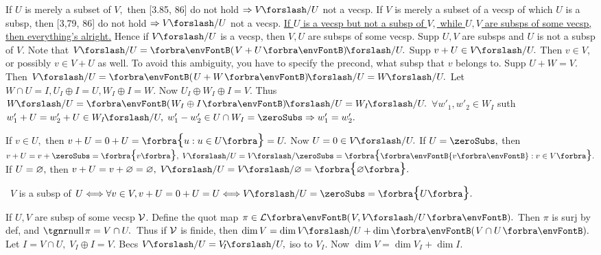 \BulletPointX\NoteFor{[3.79, 3.83]}\TextB{}
If $U$ is merely a subset of $V,$ then [3.85, 86] do not hold $\Rightarrow V\XSlash U$ not a vecsp.\TextB{}
If $V$ is merely a subset of a vecsp of which $U$ is a subsp, then [3,79, 86] do not hold $\Rightarrow V\XSlash U$ not a vecsp.\TextB{}
\uline{If $U$ is a vecsp but not a subsp of $V,$ while $U,V$ are subsps of some vecsp, then everything's alright.}\TextB{}
Hence if $V\XSlash U$ is a vecsp, then $V,U$ are subsps of some vecsp.\TextB{}
\AComm Supp $U,V$ are subsps and $U$ is not a subsp of $V.$ Note that $V\XSlash U=\Par{V+U}\XSlash U.$\TextB{}
Supp $v+U\in V\XSlash U.$ Then $v\in V$, or possibly $v\in V+U$ as well. To avoid this ambiguity,\TextB{}
you have to specify the precond, what subsp that $v$ belongs to.\TextB{\vspace{2pt}}
\AExa Supp $U+W=V.$ Then $V\XSlash U=\Par{U+W}\XSlash U=W\XSlash U.$ Let $W\cap U=I,U_I\oplus I=U,W_I\oplus I=W.$\parExa{\IndentB}
Now $U_I\oplus W_I\oplus I=V.$ Thus $W\XSlash U=\Par{W_I\oplus I}\XSlash U=W_I\XSlash U.$\parExa{\IndentB}
$\forall w'_1,w'_2\in W_I$ suth $w'_1+U=w'_2+U\in W_I\XSlash U,\;w'_1-w'_2\in U\cap W_I=\zeroSubs\Rightarrow w'_1=w'_2.$\par\vspace{4pt}
\;\;If $v\in U,$ then $v+U=0+U=\Bra{u:u\in U}=U.$ Now $U=0\in V\XSlash U.$\TextB{}
If $U=\zeroSubs,$ then $v+U=v+\zeroSubs=\Bra{v},\;V\XSlash U=V\XSlash\zeroSubs=\Bra{\Bra[\envFontB]{v}:v\in V}.$\TextB{}
If $U=\varnothing,$ then $v+U=v+\emptySet=\emptySet,\;V\XSlash U=V\XSlash\emptySet=\Bra{\emptySet}.$\par\vspace{2pt}
\BulletPointX{}\,\,\,$V$ is a subsp of $U\Longleftrightarrow\forall v\in V,v+U=0+U=U\Longleftrightarrow V\XSlash U=\zeroSubs=\Bra{U}.$
\SepLine

\BulletPointX\NoteForSmall{[3.88]}\;\;If $U,V$ are subsp of some vecsp $\mathcal{V}$. Define the quot map $\pi\in\Lm{V,V\XSlash U}.$\TextB{}
Then $\pi$ is surj by def, and $\null\pi=V\cap U.$ \,Thus if $\mathcal{V}$ is finide, then $\dim V=\dim V\XSlash U+\dim\Par{V\cap U}.$\TextB{}
\Or Let $I=V\cap U,\;V_{\!I}\oplus I=V.$ Becs $V\XSlash U=V_{\!I}\XSlash U,$ iso to $V_{\!I}.$ Now $\dim V=\dim V_{\!I}+\dim I.$
\SepLine

